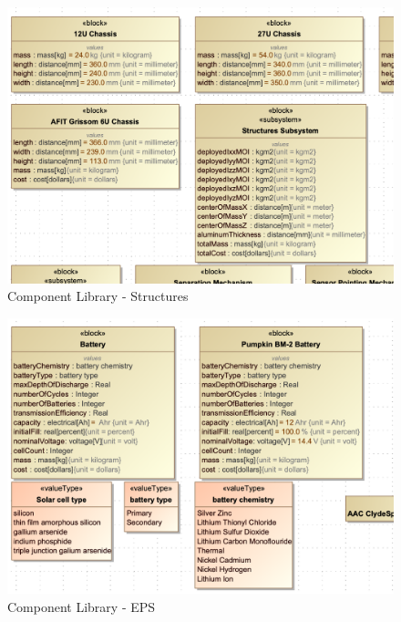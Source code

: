 \begin{figure}[H]
    \centering
    \includegraphics[width=4 in]{Thesis/Analysis_and_Results/Analysis and Results Figures/CL Structures.png}
    \caption{Component Library - Structures}
    \label{fig:CL Structures}
\end{figure}

\begin{figure}[H]
    \centering
    \includegraphics[width=4 in]{Thesis/Analysis_and_Results/Analysis and Results Figures/CL EPS.png}
    \caption{Component Library - EPS}
    \label{fig:CL EPS}
\end{figure}

